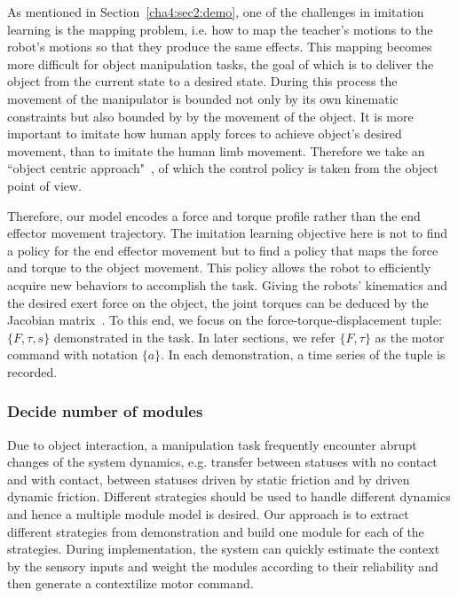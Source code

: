 As mentioned in Section~\ref{cha4:sec2:demo}, one of the challenges in imitation learning is the mapping problem, i.e. how to map the teacher's motions to the robot's motions so that they produce the same effects. This mapping becomes more difficult for object manipulation tasks, the goal of which is to deliver the object from the current state to a desired state. During this process the movement of the manipulator is bounded not only by its own kinematic constraints but also bounded by by the movement of the object. It is more important to imitate how human apply forces to achieve object's desired movement, than to imitate the human limb movement.
Therefore we take an ``object centric approach"~\cite{okamura2000overview}, of which the control policy is taken from the object point of view.


Therefore, our model encodes a force and torque profile rather than the end effector movement trajectory. The imitation learning objective here is not to find a policy for the end effector movement but to find a policy that maps the force and torque to the object movement. This policy allows the robot to efficiently acquire new behaviors to accomplish the task. %
Giving the robots' kinematics and the desired exert force on the object, the joint torques can be deduced by the Jacobian matrix~\cite{okamura2000overview}. To this end, we focus on the force-torque-displacement tuple: $\{F,\tau,s\}$ demonstrated in the task. In later sections, we refer $\{F,\tau\}$ as the motor command with notation $\{a\}$. In each demonstration, a time series of the tuple is recorded.



\subsubsection{Decide number of modules}
\label{cha4:sec2:learn:cluster}

Due to object interaction, a manipulation task frequently encounter abrupt changes of the system dynamics, e.g. transfer between statuses with no contact and with contact, between statuses driven by static friction and by driven dynamic friction. Different strategies should be used to handle different dynamics and hence a multiple module model is desired. Our approach is to extract different strategies from demonstration and build one module for each of the strategies. During implementation, the system can quickly estimate the context by the sensory inputs and weight the modules according to their reliability and then generate a contextilize motor command.

